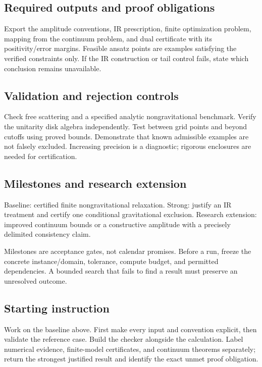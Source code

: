 \documentclass[
  11pt,
]{article}
\begin{document}
\subsection{Required outputs and proof obligations}

Export the amplitude conventions, IR prescription, finite optimization
problem, mapping from the continuum problem, and dual certificate with
its positivity/error margins. Feasible ansatz points are examples
satisfying the verified constraints only. If the IR construction or tail
control fails, state which conclusion remains unavailable.

\subsection{Validation and rejection controls}

Check free scattering and a specified analytic nongravitational
benchmark. Verify the unitarity disk algebra independently. Test between
grid points and beyond cutoffs using proved bounds. Demonstrate that
known admissible examples are not falsely excluded. Increasing precision
is a diagnostic; rigorous enclosures are needed for certification.

\subsection{Milestones and research extension}

Baseline: certified finite nongravitational relaxation. Strong: justify
an IR treatment and certify one conditional gravitational exclusion.
Research extension: improved continuum bounds or a constructive
amplitude with a precisely delimited consistency claim.

Milestones are acceptance gates, not calendar promises. Before a run,
freeze the concrete instance/domain, tolerance, compute budget, and
permitted dependencies. A bounded search that fails to find a result
must preserve an unresolved outcome.

\subsection{Starting instruction}

Work on the baseline above. First make every input and convention
explicit, then validate the reference case. Build the checker alongside
the calculation. Label numerical evidence, finite-model certificates,
and continuum theorems separately; return the strongest justified result
and identify the exact unmet proof obligation.
\end{document}
